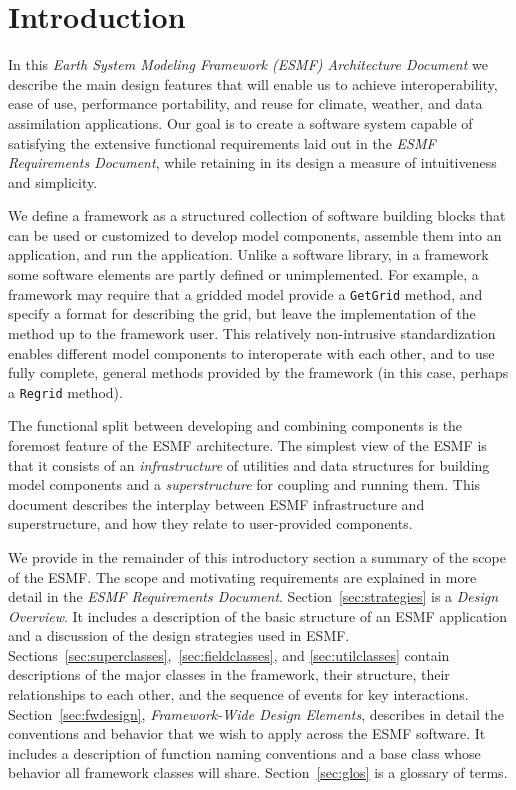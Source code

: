 \section{Introduction}

In this {\it Earth System Modeling Framework (ESMF) Architecture Document} we describe 
the main design features that will enable us to achieve interoperability, ease of 
use, performance portability, and reuse for climate, weather, and data assimilation
applications.  Our goal is to create a software system capable of satisfying
the extensive functional requirements laid out in the {\it ESMF 
Requirements Document}, while retaining in its design a measure of intuitiveness
and simplicity. 

We define a framework as a structured collection of software building blocks 
that can be used or customized to develop model components, assemble them into an 
application, and run the application.  Unlike a software library, in a framework some
software elements are partly defined or unimplemented.  For example, a framework
may require that a gridded model provide a {\tt GetGrid} method, and specify 
a format for describing the grid, but leave the implementation of the method up
to the framework user.  This relatively non-intrusive standardization enables 
different model components to interoperate with each other, and to use fully
complete, general methods provided by the framework (in this case, perhaps a 
{\tt Regrid} method).

The functional split between developing and combining components is the
foremost feature of the ESMF architecture.  The simplest view of the ESMF 
is that it consists of an {\it infrastructure} of utilities and data 
structures for building model components and a {\it superstructure} for coupling 
and running them.  This document describes the interplay between ESMF 
infrastructure and superstructure, and how they relate to user-provided components.

We provide in the remainder of this introductory section a summary of the 
scope of the ESMF.  The scope and motivating requirements are explained in more detail in the {\it ESMF Requirements Document}.  Section~\ref{sec:strategies} is 
a {\it Design Overview}.  It includes 
a description of the basic structure of an ESMF application and a discussion of 
the design strategies
used in ESMF.  Sections~\ref{sec:superclasses},~\ref{sec:fieldclasses}, and
\ref{sec:utilclasses} contain descriptions of the 
major classes in the framework, their structure, their relationships to each other, 
and the sequence of events for key interactions.  Section~\ref{sec:fwdesign}, {\it 
Framework-Wide Design Elements}, describes in detail the conventions and behavior
that we wish to apply across the ESMF software.  It
includes a description of function naming conventions and a base class whose behavior all 
framework classes will share.  Section~\ref{sec:glos} is a glossary of terms.








